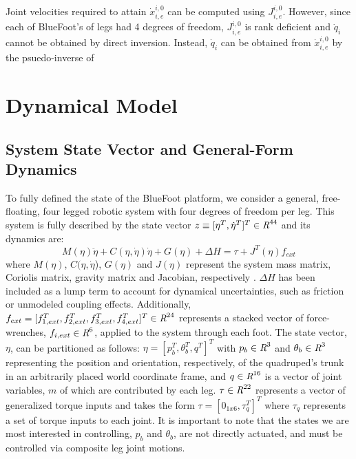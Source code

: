 			Joint velocities required to attain $\dot{x}^{i,0}_{i,e}$ can be computed using $J^{i,0}_{i,e}$. However, since each of BlueFoot's of legs had 4 degrees of freedom, $J^{i,0}_{i,e}$ is rank deficient and $\dot{q}_{i}$ cannot be obtained by direct inversion. Instead, $\dot{q}_{i}$ can be obtained from $\dot{x}^{i,0}_{i,e}$ by the psuedo-inverse of  





	\section{Dynamical Model}
	

		\subsection{System State Vector and General-Form Dynamics}
		
			To fully defined the state of the BlueFoot platform, we consider a general, free-floating, four legged robotic system with four degrees of freedom per leg. This system is fully described by the state vector $z \equiv [\eta^{T}, \dot{\eta}^{T}]^{T} \in \emph{R}^{44}$ and its dynamics are:
				\begin{equation}
					M(\eta)\ddot{\eta} + C(\eta,\dot{\eta})\dot{\eta} + G(\eta) + \Delta{H} = \tau + J^T(\eta) f_{ext} %
					\label{eq::normal_form_dynamics}
				\end{equation}
			where $M(\eta)$, $C(\eta,\dot{\eta}$), $G(\eta)$ and $J(\eta)$ represent the system mass matrix, Coriolis matrix, gravity matrix and Jacobian, respectively \cite{Wieber2006}. $\Delta{H}$ has been included as a lump term to account for dynamical uncertainties, such as friction or unmodeled coupling effects. Additionally, $f_{ext} = [ f_{1,ext}^{T},f_{2,ext}^{T},f_{3,ext}^{T},f_{4,ext}^{T}]^{T} \in \emph{R}^{24}$ represents a stacked vector of force-wrenches, $f_{i,ext} \in \emph{R}^{6}$, applied to the system through each \Ith foot. The state vector, $\eta$, can be partitioned as follows: $\eta = [ {p}_{b}^{T}, \theta_{b}^{T}, q^{T} ]^{T}$ with ${p}_{b} \in \emph{R}^{3}$ and $\theta_{b} \in \emph{R}^{3}$ representing the position and orientation, respectively, of the quadruped's trunk in an arbitrarily placed world coordinate frame, and $q \in \emph{R}^{16}$ is a vector of joint variables, $m$ of which are contributed by each leg. $\tau \in \emph{R}^{22}$ represents a vector of generalized torque inputs and takes the form $\tau = [ 0_{1x6}, \tau_{q}^{T} ]^{T}$ where $\tau_{q}$ represents a set of torque inputs to each joint. It is important to note that the states we are most interested in controlling, ${p}_{b}$ and $\theta_{b}$, are not directly actuated, and must be controlled via composite leg joint motions.		

